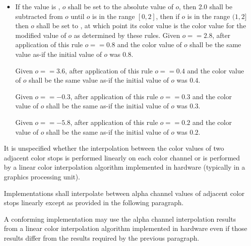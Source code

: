 \begin{enumeratea}
\begin{itemize}
	\item If the  value is , $o$ shall be set to the absolute value of $o$, then 2.0 shall be subtracted from $o$ until $o$ is in the range $[0,2]$, then if $o$ is in the range $(1,2]$ then $o$ shall be set to , at which point its color value is the color value for the modified value of $o$ as determined by these rules.
	\enterexample
	Given $o == 2.8$, after application of this rule $o == 0.8$ and the color value of $o$ shall be the same value as-if the initial value of $o$ was $0.8$.
	
	Given $o == 3.6$, after application of this rule $o == 0.4$ and the color value of $o$ shall be the same value as-if the initial value of $o$ was $0.4$.
	
	Given $o == -0.3$, after application of this rule $o == 0.3$ and the color value of $o$ shall be the same as-if the initial value of $o$ was $0.3$.
	
	Given $o == -5.8$, after application of this rule $o == 0.2$ and the color value of $o$ shall be the same as-if the initial value of $o$ was $0.2$.
	\exitexample
	\end{itemize}
\end{enumeratea}

\pnum
It is unspecified whether the interpolation between the color values of two adjacent color stops is performed linearly on each color channel or is performed by a linear color interpolation algorithm implemented in hardware (typically in a graphics processing unit).

\pnum
Implementations shall interpolate between alpha channel values of adjacent color stops linearly except as provided in the following paragraph.

\pnum
A conforming implementation may use the alpha channel interpolation results from a linear color interpolation algorithm implemented in hardware even if those results differ from the results required by the previous paragraph.

